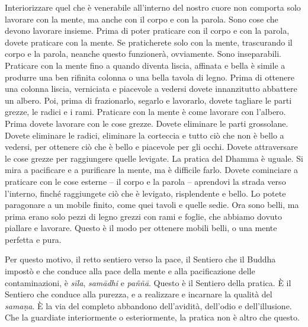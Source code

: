 Interiorizzare quel che è venerabile all'interno del nostro cuore non
comporta solo lavorare con la mente, ma anche con il corpo e con la
parola. Sono cose che devono lavorare insieme. Prima di poter praticare
con il corpo e con la parola, dovete praticare con la mente. Se
praticherete solo con la mente, trascurando il corpo e la parola,
neanche questo funzionerà, ovviamente. Sono inseparabili. Praticare con
la mente fino a quando diventa liscia, affinata e bella è simile a
produrre una ben rifinita colonna o una bella tavola di legno. Prima di
ottenere una colonna liscia, verniciata e piacevole a vedersi dovete
innanzitutto abbattere un albero. Poi, prima di frazionarlo, segarlo e
lavorarlo, dovete tagliare le parti grezze, le radici e i rami.
Praticare con la mente è come lavorare con l'albero. Prima dovete
lavorare con le cose grezze. Dovete eliminare le parti grossolane.
Dovete eliminare le radici, eliminare la corteccia e tutto ciò che non è
bello a vedersi, per ottenere ciò che è bello e piacevole per gli occhi.
Dovete attraversare le cose grezze per raggiungere quelle levigate. La
pratica del Dhamma è uguale. Si mira a pacificare e a purificare la
mente, ma è difficile farlo. Dovete cominciare a praticare con le cose
esterne -- il corpo e la parola -- aprendovi la strada verso l'interno,
finché raggiungete ciò che è levigato, risplendente e bello. Lo potete
paragonare a un mobile finito, come quei tavoli e quelle sedie. Ora sono
belli, ma prima erano solo pezzi di legno grezzi con rami e foglie, che
abbiamo dovuto piallare e lavorare. Questo è il modo per ottenere mobili
belli, o una mente perfetta e pura.

Per questo motivo, il retto sentiero verso la pace, il Sentiero che il
Buddha impostò e che conduce alla pace della mente e alla pacificazione
delle contaminazioni, è \emph{sīla}, \emph{samādhi} e \emph{paññā}.
Questo è il Sentiero della pratica. È il Sentiero che conduce alla
purezza, e a realizzare e incarnare la qualità del \emph{samaṇa}. È la
via del completo abbandono dell'avidità, dell'odio e dell'illusione. Che
la guardiate interiormente o esteriormente, la pratica non è altro che
questo.

